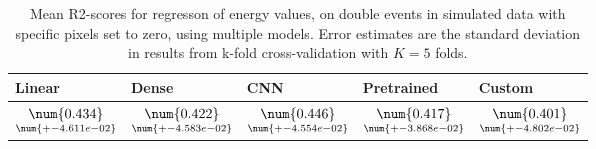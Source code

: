 \begin{table}
\centering
\caption{
Mean R2-scores for regresson of energy values, on double events in simulated data with specific pixels
set to zero, using multiple models. Error estimates are the standard deviation in results from k-fold 
cross-validation with $K=5$ folds.
}
\label{tab:regression-simulated-double-energy-pixelmod-r2}
\begin{tabular}{lllll}
\toprule
                                             Linear &                                               Dense &                                                 CNN &                                          Pretrained &                                              Custom \\
\midrule
 $\underset{\num{+- 4.611e-02 }  }{\num{ 0.434 } }$ &  $\underset{\num{+- 4.583e-02 }  }{\num{ 0.422 } }$ &  $\underset{\num{+- 4.554e-02 }  }{\num{ 0.446 } }$ &  $\underset{\num{+- 3.868e-02 }  }{\num{ 0.417 } }$ &  $\underset{\num{+- 4.802e-02 }  }{\num{ 0.401 } }$ \\
\bottomrule
\end{tabular}
\end{table}
